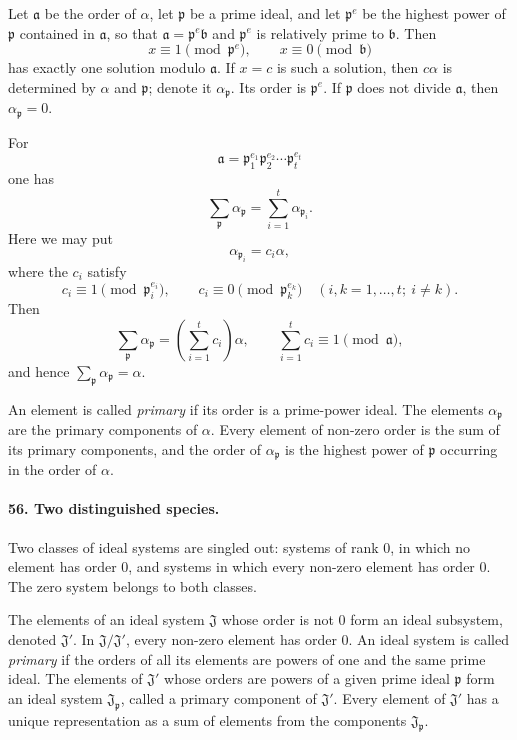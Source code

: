 \documentclass[11pt]{article}
\begin{document}
Let $\mathfrak a$ be the order of $\alpha$, let $\mathfrak p$ be a prime ideal, and let $\mathfrak p^e$ be the highest power of $\mathfrak p$ contained in $\mathfrak a$, so that $\mathfrak a=\mathfrak p^e\mathfrak b$ and $\mathfrak p^e$ is relatively prime to $\mathfrak b$. Then
\begin{equation}
  x\equiv1\pmod{\mathfrak p^e},
  \qquad
  x\equiv0\pmod{\mathfrak b}
\tag{88}
\end{equation}
has exactly one solution modulo $\mathfrak a$. If $x=c$ is such a solution, then $c\alpha$ is determined by $\alpha$ and $\mathfrak p$; denote it $\alpha_{\mathfrak p}$. Its order is $\mathfrak p^e$. If $\mathfrak p$ does not divide $\mathfrak a$, then $\alpha_{\mathfrak p}=0$.

For
\[
  \mathfrak a=\mathfrak p_1^{e_1}\mathfrak p_2^{e_2}\cdots\mathfrak p_t^{e_t}
\]
one has
\begin{equation}
  \sum_{\mathfrak p}\alpha_{\mathfrak p}=\sum_{i=1}^{t}\alpha_{\mathfrak p_i}.
\tag{89}
\end{equation}
Here we may put
\begin{equation}
  \alpha_{\mathfrak p_i}=c_i\alpha,
\tag{90}
\end{equation}
where the $c_i$ satisfy
\begin{equation}
  c_i\equiv1\pmod{\mathfrak p_i^{e_i}},\qquad
  c_i\equiv0\pmod{\mathfrak p_k^{e_k}}
  \quad (i,k=1,\ldots,t;\ i\ne k).
\tag{91}
\end{equation}
Then
\[
  \sum_{\mathfrak p}\alpha_{\mathfrak p}
  =\left(\sum_{i=1}^{t}c_i\right)\alpha,
  \qquad
  \sum_{i=1}^{t}c_i\equiv1\pmod{\mathfrak a},
\]
and hence $\sum_{\mathfrak p}\alpha_{\mathfrak p}=\alpha$.

An element is called \emph{primary} if its order is a prime-power ideal. The elements $\alpha_{\mathfrak p}$ are the primary components of $\alpha$. Every element of non-zero order is the sum of its primary components, and the order of $\alpha_{\mathfrak p}$ is the highest power of $\mathfrak p$ occurring in the order of $\alpha$.

\paragraph{56. Two distinguished species.}
Two classes of ideal systems are singled out: systems of rank $0$, in which no element has order $0$, and systems in which every non-zero element has order $0$. The zero system belongs to both classes.

The elements of an ideal system $\mathfrak J$ whose order is not $0$ form an ideal subsystem, denoted $\mathfrak J'$. In $\mathfrak J/\mathfrak J'$, every non-zero element has order $0$. An ideal system is called \emph{primary} if the orders of all its elements are powers of one and the same prime ideal. The elements of $\mathfrak J'$ whose orders are powers of a given prime ideal $\mathfrak p$ form an ideal system $\mathfrak J_{\mathfrak p}$, called a primary component of $\mathfrak J'$. Every element of $\mathfrak J'$ has a unique representation as a sum of elements from the components $\mathfrak J_{\mathfrak p}$.
\end{document}
